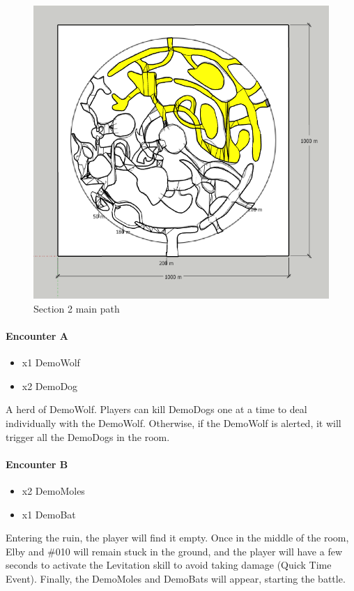 \begin{figure}[H]
	\centering
	\includegraphics[width=0.8\linewidth]{images/map/2D_map_section_02.png}
	\caption*{Section 2 main path}
\end{figure}

\paragraph{Encounter A}
\begin{itemize}
	\item x1 DemoWolf
	\item x2 DemoDog
\end{itemize}

A herd of DemoWolf. Players can kill DemoDogs one at a time to deal individually with the DemoWolf. Otherwise, if the DemoWolf is alerted, it will trigger all the DemoDogs in the room.

\paragraph{Encounter B}
\begin{itemize}
	\item x2 DemoMoles
	\item x1 DemoBat
\end{itemize}

Entering the ruin, the player will find it empty. Once in the middle of the room, Elby and \#010 will remain stuck in the ground, and the player will have a few seconds to activate the Levitation skill to avoid taking damage (Quick Time Event). Finally, the DemoMoles and DemoBats will appear, starting the battle.

